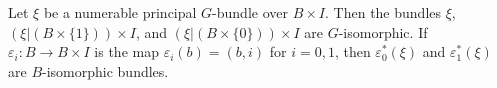 Let $\xi$ be a numerable principal $G$-bundle over $B \times I$. Then the bundles $\xi$, $(\xi|(B \times \{1\})) \times I$, and $(\xi|(B \times \{0\})) \times I$ are $G$-isomorphic. If $\varepsilon_i: B \rightarrow B \times I$ is the map $\varepsilon_i(b) = (b, i)$ for $i = 0, 1$, then $\varepsilon_0^*(\xi)$ and $\varepsilon_1^*(\xi)$ are $B$-isomorphic bundles.
